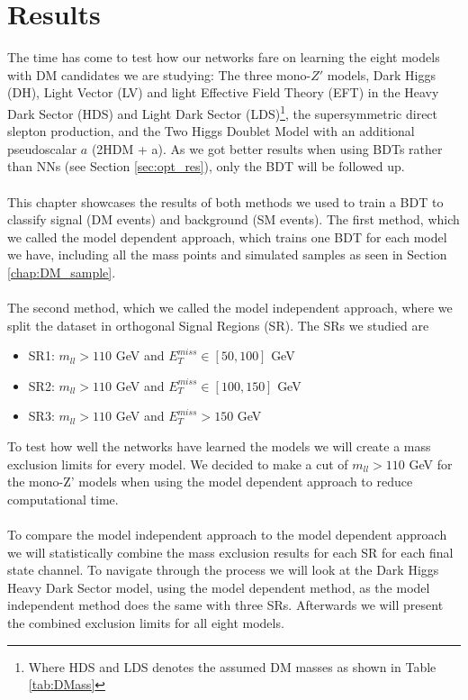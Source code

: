 \documentclass[12pt, a4paper]{book}
\begin{document}
\chapter{Results}\label{chap:results}
The time has come to test how our networks fare on learning the eight models with DM candidates we are studying: The three mono-$Z'$ models, Dark Higgs (DH), Light Vector (LV) and light Effective Field Theory (EFT) in the Heavy Dark Sector (HDS) and Light Dark Sector (LDS)\footnote{Where HDS and LDS denotes the assumed DM masses as shown in Table \ref{tab:DMass}}, 
the supersymmetric direct slepton production, and the Two Higgs Doublet Model with an additional pseudoscalar $a$ (2HDM + a). As we got better results when using BDTs rather than NNs (see Section \ref{sec:opt_res}), only the BDT will be followed up. \\
\\This chapter showcases the results of both methods we used to train a BDT to classify signal (DM events) and background (SM events). The first method, which we called the model dependent approach, which trains one BDT for each model we have, including all the mass points and simulated samples as seen in Section \ref{chap:DM_sample}. \\
\\The second method, which we called the model independent approach, where we split the dataset in orthogonal Signal Regions (SR). The SRs we studied are
\begin{itemize}
   \item SR1: $m_{ll} >110$ GeV and $E_T^{miss} \in [50, 100]$ GeV
   \item SR2: $m_{ll} >110$ GeV and $E_T^{miss} \in [100, 150]$ GeV
   \item SR3: $m_{ll} >110$ GeV and $E_T^{miss} >150$ GeV
\end{itemize}
To test how well the networks have learned the models we will create a mass exclusion limits for every model. We decided to make a cut of $m_{ll} >110$ GeV for the mono-Z' models when using the model dependent approach to reduce computational time.\\
\\To compare the model independent approach to the model dependent approach we will statistically combine the mass exclusion results for each SR for each final state channel. To navigate through the process we will look at the Dark Higgs Heavy Dark Sector model, using the model dependent method, 
as the model independent method does the same with three SRs. Afterwards we will present the combined exclusion limits for all eight models.
\end{document}
